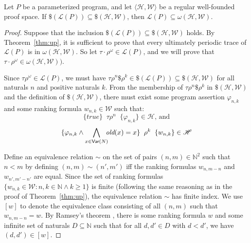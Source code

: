 \documentclass[9pt,nocopyrightspace]{sigplanconf}
\theoremstyle{definition}
\newcommand{\tuple}[1]{\langle #1 \rangle}
\newcommand{\true}{\textit{true}}
\newcommand{\hoare}[3]{\{{#1}\}\;\;#2\;\;\{{#3}\}}
\newcommand{\rankformula}{w}
\newcommand{\rankformulas}{\mathscr{W}}
\newcommand{\lang}{\mathcal{L}}
\renewcommand{\phi}{\varphi}
\newcommand{\old}[1]{\textit{old}(#1)}
\newcommand{\iVar}[1]{\textsf{Var}(#1)}
\begin{document}
\begin{theorem} \label{thm:inclusion-soundness}
  Let $P$ be a parameterized program, and let $\tuple{\mathscr{H},\rankformulas}$ be a
  regular well-founded proof space.  If
  $\$(\lang(P)) \subseteq \$(\mathscr{H},\rankformulas)$, then $\lang(P) \subseteq
  \omega(\mathscr{H},\rankformulas)$.
\end{theorem}
\begin{proof}
  Suppose that the inclusion $\$(\lang(P)) \subseteq \$(\mathscr{H},\rankformulas)$ holds.
  By Theorem~\ref{thm:up}, it is sufficient to prove that every ultimately
  periodic trace of $\lang(P)$ is in $\omega(\mathscr{H},\rankformulas)$.  So let
  $\tau\cdot\rho^\omega \in \lang(P)$, and we will prove that $\tau\cdot\rho^\omega \in
  \omega(\mathscr{H},\rankformulas))$.

  Since $\tau\rho^\omega \in \lang(P)$, we must have $\tau\rho^n\$\rho^k \in
  \$(\lang(P)) \subseteq \$(\mathscr{H},\rankformulas)$ for all naturals $n$ and positive
  naturals $k$.  From the membership of $\tau\rho^n\$\rho^k$ in
  $\$(\mathscr{H},\rankformulas)$ and the definition of $\$(\mathscr{H},\rankformulas)$, there must
  exist some program assertion $\phi_{n,k}$ and some ranking formula
  $\rankformula_{n,k} \in \mathscr{W}$ such that:
  \[\hoare{\true}{\tau\rho^n}{\phi_{n,k}} \in \mathscr{H}\text{, and}\]
  \[\hoare{\phi_{n,k} \land \bigwedge_{x \in \iVar{N}}\hspace*{-5pt} \old{x} = x}{\rho^k}{\rankformula_{n,k}} \in \mathscr{H}\]

  Define an equivalence relation $\sim$ on the set of pairs $(n,m) \in
  \mathbb{N}^2$ such that $n<m$ by defining $(n,m) \sim (n',m')$ iff the
  ranking formulas $\rankformula_{n,m-n}$ and
  $\rankformula_{n',m'-n'}$ are equal.  Since the set of ranking
  formulas $\{ \rankformula_{n,k} \in \mathscr{W}: n,k \in \mathbb{N} \land k \geq 1
  \}$ is finite (following the same reasoning as in the proof of
  Theorem~\ref{thm:up}), the equivalence relation $\sim$ has finite index.  We
  use $[\rankformula]$ to denote the equivalence class consisting of all
  $(n,m)$ such that $\rankformula_{n,m-n} = \rankformula$.  By
  Ramsey's theorem \cite{Ramsey1930}, there is some ranking formula
  $\rankformula$ and some infinite set of naturals $D \subseteq \mathbb{N}$
  such that for all $d,d' \in D$ with $d<d'$, we have $(d,d') \in
  [\rankformula]$.


\end{proof}
\end{document}
